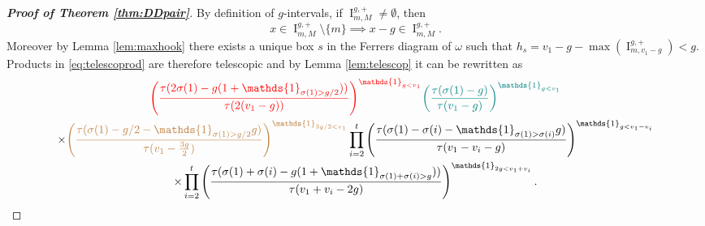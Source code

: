 \documentclass[11pt,letterpaper]{amsart}
\def\cch{\mathcal H}
\DeclareMathOperator{\I}{I}
\numberwithin{equation}{section}
\numberwithin{df}{section}
\begin{document}
\begin{proof}[\textbf{Proof of Theorem \ref{thm:DDpair}}]
By definition of $g$-intervals, if $\I_{m,M}^{g,+}\neq \emptyset$, then 
$$x\in\I_{m,M}^{g,+}\setminus\lbrace m\rbrace\implies x-g\in \I_{m,M}^{g,+}.$$
 Moreover by Lemma \ref{lem:maxhook} there exists a unique box $s$ in the Ferrers diagram of $\omega$ such that $h_s=v_1-g-\max(\I_{m,v_1-g}^{g,+})<g$. Products in \eqref{eq:telescoprod} are therefore telescopic and by Lemma \ref{lem:telescop} it can be rewritten as
%
\begin{multline}\label{eq:last_plus}
\textcolor{red}{\left(\frac{\tau(2\sigma(1)-g(1+\mathds{1}_{\sigma(1)>g/2}))}{\tau(2(v_1-g))}\right)^{\mathds{1}_{g<v_1}}}\textcolor{teal}{\left(\frac{\tau(\sigma(1)-g)}{\tau(v_1-g)}\right)^{\mathds{1}_{g<v_1}}}\\\times\textcolor{brown}{\left(\frac{\tau(\sigma(1)-g/2-\mathds{1}_{\sigma(1)>g/2}g)}{\tau(v_1-\frac{3g}{2})}\right)^{\mathds{1}_{3g/2<v_1}}}
\prod_{i=2}^{t}\left(\frac{\tau(\sigma(1)-\sigma(i)-\mathds{1}_{\sigma(1)>\sigma(i)}g)}{\tau(v_1-v_i-g)}\right)^{\mathds{1}_{g<v_1-v_i}}\\
\times\prod_{i=2}^{t}\left(\frac{\tau(\sigma(1)+\sigma(i)-g(1+\mathds{1}_{\sigma(1)+\sigma(i)>g}))}{\tau(v_1+v_i-2g)}\right)^{\mathds{1}_{2g<v_1+v_i}}.
\end{multline}


\end{proof}
\end{document}
